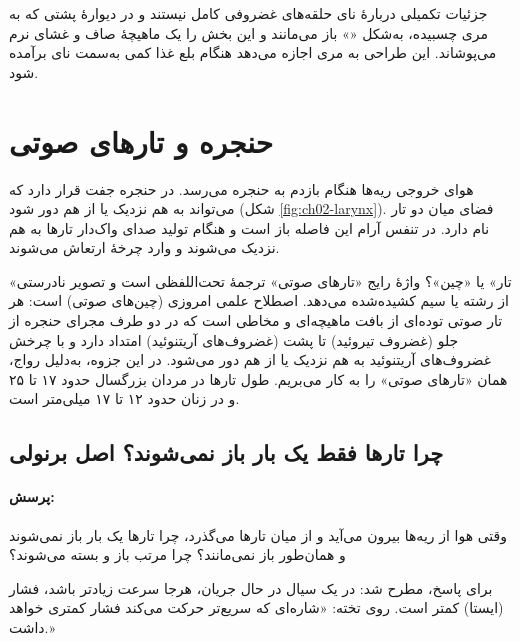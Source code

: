 \begin{addedbox}{جزئیات تکمیلی دربارهٔ نای}
حلقه‌های غضروفی کامل نیستند و در دیوارهٔ پشتی که به مری چسبیده، به‌شکل «» باز می‌مانند و این بخش را یک ماهیچهٔ صاف و غشای نرم می‌پوشاند. این طراحی به مری اجازه می‌دهد هنگام بلع غذا کمی به‌سمت نای برآمده شود.
\end{addedbox}

\section{حنجره و تارهای صوتی}

هوای خروجی ریه‌ها هنگام بازدم به حنجره می‌رسد. در حنجره جفت  قرار دارد که می‌تواند به هم نزدیک یا از هم دور شود (شکل \ref{fig:ch02-larynx}). فضای میان دو تار  نام دارد. در تنفس آرام این فاصله باز است و هنگام تولید صدای واک‌دار تارها به هم نزدیک می‌شوند و وارد چرخهٔ ارتعاش می‌شوند.

\label{fig:ch02-larynx}

\begin{correctionbox}{«تار» یا «چین»؟}
واژهٔ رایج «تارهای صوتی» ترجمهٔ تحت‌اللفظی  است و تصویر نادرستی از رشته یا سیم کشیده‌شده می‌دهد. اصطلاح علمی امروزی  (چین‌های صوتی) است: هر تار صوتی توده‌ای از بافت ماهیچه‌ای و مخاطی است که در دو طرف مجرای حنجره از جلو (غضروف تیروئید) تا پشت (غضروف‌های آریتنوئید) امتداد دارد و با چرخش غضروف‌های آریتنوئید به هم نزدیک یا از هم دور می‌شود. در این جزوه، به‌دلیل رواج، همان «تارهای صوتی» را به کار می‌بریم. طول تارها در مردان بزرگسال حدود ۱۷ تا ۲۵ و در زنان حدود ۱۲ تا ۱۷ میلی‌متر است.
\end{correctionbox}

\subsection{چرا تارها فقط یک بار باز نمی‌شوند؟ اصل برنولی}
\paragraph{پرسش:} وقتی هوا از ریه‌ها بیرون می‌آید و از میان تارها می‌گذرد، چرا تارها یک بار باز نمی‌شوند و همان‌طور باز نمی‌مانند؟ چرا مرتب باز و بسته می‌شوند؟

برای پاسخ،  مطرح شد: در یک سیال در حال جریان، هرجا سرعت زیادتر باشد، فشار (ایستا) کمتر است. روی تخته: «شاره‌ای که سریع‌تر حرکت می‌کند فشار کمتری خواهد داشت.»

